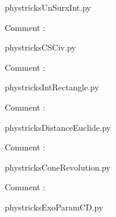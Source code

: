     \newcommand{\CaptionFigUnSurxInt}{<+Type your caption here+>}
    \begin{center}
        
    \end{center}
    phystricksUnSurxInt.py

    Comment : 

    \clearpage
    


    \newcommand{\CaptionFigCSCiv}{<+Type your caption here+>}
    \begin{center}
        
    \end{center}
    phystricksCSCiv.py

    Comment : 

    \clearpage
    


    \newcommand{\CaptionFigIntRectangle}{<+Type your caption here+>}
    \begin{center}
        
    \end{center}
    phystricksIntRectangle.py

    Comment : 

    \clearpage
    


    \newcommand{\CaptionFigDistanceEuclide}{<+Type your caption here+>}
    \begin{center}
        
    \end{center}
    phystricksDistanceEuclide.py

    Comment : 

    \clearpage
    


    \newcommand{\CaptionFigConeRevolution}{<+Type your caption here+>}
    \begin{center}
        
    \end{center}
    phystricksConeRevolution.py

    Comment : 

    \clearpage
    


    \newcommand{\CaptionFigExoParamCD}{<+Type your caption here+>}
    \begin{center}
        
    \end{center}
    phystricksExoParamCD.py

